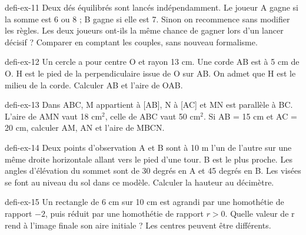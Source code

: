 \begin{blocEdition}{defi-ex-11}
Deux dés équilibrés sont lancés indépendamment. Le joueur A gagne si la somme est 6 ou 8 ; B gagne si elle est 7. Sinon on recommence sans modifier les règles. Les deux joueurs ont-ils la même chance de gagner lors d’un lancer décisif ? Comparer en comptant les couples, sans nouveau formalisme.
\end{blocEdition}
\begin{blocEdition}{defi-ex-12}
Un cercle a pour centre O et rayon 13 cm. Une corde AB est à 5 cm de O. H est le pied de la perpendiculaire issue de O sur AB. On admet que H est le milieu de la corde. Calculer AB et l’aire de OAB.\label{fig-defi-12}

\end{blocEdition}
\begin{blocEdition}{defi-ex-13}
Dans ABC, M appartient à [AB], N à [AC] et MN est parallèle à BC. L’aire de AMN vaut 18 cm$^2$, celle de ABC vaut 50 cm$^2$. Si AB = 15 cm et AC = 20 cm, calculer AM, AN et l’aire de MBCN.\label{fig-defi-13}

\end{blocEdition}
\begin{blocEdition}{defi-ex-14}
Deux points d’observation A et B sont à 10 m l’un de l’autre sur une même droite horizontale allant vers le pied d’une tour. B est le plus proche. Les angles d’élévation du sommet sont de 30 degrés en A et 45 degrés en B. Les visées se font au niveau du sol dans ce modèle. Calculer la hauteur au décimètre.\label{fig-defi-14}

\end{blocEdition}
\begin{blocEdition}{defi-ex-15}
Un rectangle de 6 cm sur 10 cm est agrandi par une homothétie de rapport $-2$, puis réduit par une homothétie de rapport $r>0$. Quelle valeur de r rend à l’image finale son aire initiale ? Les centres peuvent être différents.\label{fig-defi-15}

\end{blocEdition}
